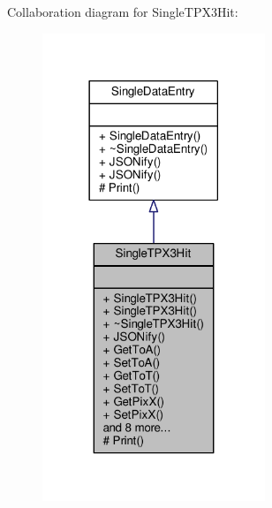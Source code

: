 Collaboration diagram for Single\+T\+P\+X3\+Hit\+:\nopagebreak
\begin{figure}[H]
\begin{center}
\leavevmode
\includegraphics[width=189pt]{classSingleTPX3Hit__coll__graph}
\end{center}
\end{figure}
